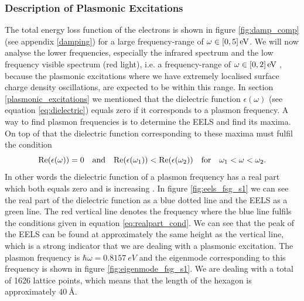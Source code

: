 
\subsubsection{Description of Plasmonic Excitations}

The total energy loss function of the electrons is shown in figure \ref{fig:damp_comp} (see appendix \ref{damping}) for a large frequency-range of $\omega \in \left[0,5\right]\mathrm{eV}$. We will now analyse the lower frequencies, especially the infrared spectrum and the low frequency visible spectrum (red light), i.e. a frequency-range of $\omega \in\left[0,2\right]\mathrm{eV}$ \cite{Serway2014}, because the plasmonic excitations where we have extremely localised surface charge density oscillations, are expected to be within this range. In section \ref{plasmonic_excitations} we mentioned that the dielectric function $\epsilon(\omega)$ (see equation \ref{eq:dielectric}) equals zero if it corresponds to a plasmon frequency. A way to find plasmon frequencies is to determine the EELS and find its maxima. On top of that the dielectric function corresponding to these maxima must fulfil the condition \cite{Westerhout2018}
\begin{equation}\label{eq:realpart_cond}
    \text{Re}(\epsilon(\omega))=0 \quad \mathrm{and} \quad \text{Re}(\epsilon(\omega_1))<\text{Re}(\epsilon(\omega_2)) \quad \mathrm{for} \quad \omega_1<\omega<\omega_2.
\end{equation}
In other words the dielectric function of a plasmon frequency has a real part which both equals zero and is increasing \cite{Westerhout2018}. In figure \ref{fig:eels_fsg_s1} we can see the real part of the dielectric function as a blue dotted line and the EELS as a green line. The red vertical line denotes the frequency where the blue line fulfils the conditions given in equation \ref{eq:realpart_cond}. We can see that the peak of the EELS can be found at approximately the same height as the vertical line, which is a strong indicator that we are dealing with a plasmonic excitation. The plasmon frequency is $\hbar\omega = \SI{0.8157}{eV}$ and the eigenmode corresponding to this frequency is shown in figure \ref{fig:eigenmode_fsg_s1}. We are dealing with a total of 1626 lattice points, which means that the length of the hexagon is approximately $\SI{40}{\angstrom}$.

